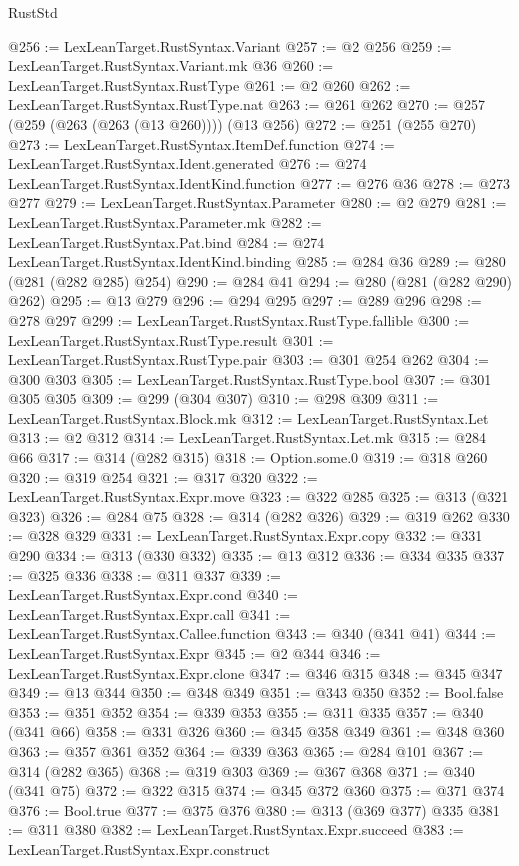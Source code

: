 \begin{lexlean}{RustStd}
\begin{coremodule}
@256 := LexLeanTarget.RustSyntax.Variant
@257 := @2 @256
@259 := LexLeanTarget.RustSyntax.Variant.mk @36
@260 := LexLeanTarget.RustSyntax.RustType
@261 := @2 @260
@262 := LexLeanTarget.RustSyntax.RustType.nat
@263 := @261 @262
@270 := @257 (@259 (@263 (@263 (@13 @260)))) (@13 @256)
@272 := @251 (@255 @270)
@273 := LexLeanTarget.RustSyntax.ItemDef.function
@274 := LexLeanTarget.RustSyntax.Ident.generated
@276 := @274 LexLeanTarget.RustSyntax.IdentKind.function
@277 := @276 @36
@278 := @273 @277
@279 := LexLeanTarget.RustSyntax.Parameter
@280 := @2 @279
@281 := LexLeanTarget.RustSyntax.Parameter.mk
@282 := LexLeanTarget.RustSyntax.Pat.bind
@284 := @274 LexLeanTarget.RustSyntax.IdentKind.binding
@285 := @284 @36
@289 := @280 (@281 (@282 @285) @254)
@290 := @284 @41
@294 := @280 (@281 (@282 @290) @262)
@295 := @13 @279
@296 := @294 @295
@297 := @289 @296
@298 := @278 @297
@299 := LexLeanTarget.RustSyntax.RustType.fallible
@300 := LexLeanTarget.RustSyntax.RustType.result
@301 := LexLeanTarget.RustSyntax.RustType.pair
@303 := @301 @254 @262
@304 := @300 @303
@305 := LexLeanTarget.RustSyntax.RustType.bool
@307 := @301 @305 @305
@309 := @299 (@304 @307)
@310 := @298 @309
@311 := LexLeanTarget.RustSyntax.Block.mk
@312 := LexLeanTarget.RustSyntax.Let
@313 := @2 @312
@314 := LexLeanTarget.RustSyntax.Let.mk
@315 := @284 @66
@317 := @314 (@282 @315)
@318 := Option.some.{0}
@319 := @318 @260
@320 := @319 @254
@321 := @317 @320
@322 := LexLeanTarget.RustSyntax.Expr.move
@323 := @322 @285
@325 := @313 (@321 @323)
@326 := @284 @75
@328 := @314 (@282 @326)
@329 := @319 @262
@330 := @328 @329
@331 := LexLeanTarget.RustSyntax.Expr.copy
@332 := @331 @290
@334 := @313 (@330 @332)
@335 := @13 @312
@336 := @334 @335
@337 := @325 @336
@338 := @311 @337
@339 := LexLeanTarget.RustSyntax.Expr.cond
@340 := LexLeanTarget.RustSyntax.Expr.call
@341 := LexLeanTarget.RustSyntax.Callee.function
@343 := @340 (@341 @41)
@344 := LexLeanTarget.RustSyntax.Expr
@345 := @2 @344
@346 := LexLeanTarget.RustSyntax.Expr.clone
@347 := @346 @315
@348 := @345 @347
@349 := @13 @344
@350 := @348 @349
@351 := @343 @350
@352 := Bool.false
@353 := @351 @352
@354 := @339 @353
@355 := @311 @335
@357 := @340 (@341 @66)
@358 := @331 @326
@360 := @345 @358 @349
@361 := @348 @360
@363 := @357 @361 @352
@364 := @339 @363
@365 := @284 @101
@367 := @314 (@282 @365)
@368 := @319 @303
@369 := @367 @368
@371 := @340 (@341 @75)
@372 := @322 @315
@374 := @345 @372 @360
@375 := @371 @374
@376 := Bool.true
@377 := @375 @376
@380 := @313 (@369 @377) @335
@381 := @311 @380
@382 := LexLeanTarget.RustSyntax.Expr.succeed
@383 := LexLeanTarget.RustSyntax.Expr.construct

\end{coremodule}
\end{lexlean}
